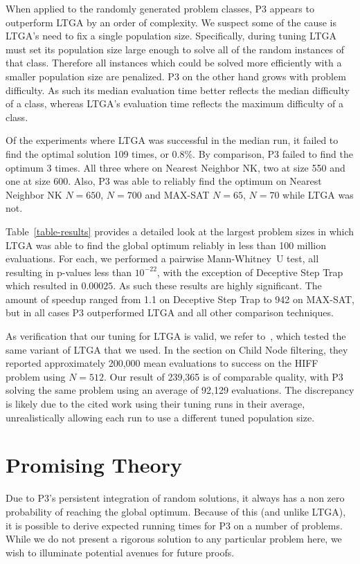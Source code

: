 \documentclass{sig-alternate}
\begin{document}
When applied to the randomly generated problem classes, P3 appears to outperform LTGA
by an order of complexity.  We suspect some of the cause is LTGA's need to fix
a single population size.  Specifically, during tuning LTGA must set its population
size large enough to solve all of the random instances of that class.  Therefore
all instances which could be solved more efficiently with a smaller population size
are penalized.  P3 on the other hand grows with problem difficulty.  As such its
median evaluation time better reflects the median difficulty of a class, whereas LTGA's
evaluation time reflects the maximum difficulty of a class.

Of the experiments where LTGA was successful in the median run, it failed to find the optimal solution
109 times, or 0.8\%.  By comparison, P3 failed to find the optimum 3 times.  All three
where on Nearest Neighbor NK, two at size 550 and one at size 600.  Also, P3 was able
to reliably find the optimum on Nearest Neighbor NK $N=650$, $N=700$ and MAX-SAT $N=65$, $N=70$
while LTGA was not.

Table~\ref{table-results} provides a detailed look at the largest problem sizes
in which LTGA was able to find the global optimum reliably in less than 100 million
evaluations.  For each, we performed a pairwise Mann-Whitney~U test, all resulting
in p-values less than $10^{-22}$, with the exception of Deceptive Step Trap which
resulted in $0.00025$.  As such these results are highly significant.  The amount
of speedup ranged from 1.1 on Deceptive Step Trap to 942 on MAX-SAT, but in all
cases P3 outperformed LTGA and all other comparison techniques.

As verification that our tuning for LTGA is valid, we refer
to~\cite{thierens:2013:ltgahiff}, which tested the same variant of LTGA that we
used.  In the section on Child Node filtering, they reported approximately 200,000
mean evaluations to success on the HIFF problem using $N=512$.  Our result of
239,365 is of comparable quality, with P3 solving the same problem using an average
of 92,129 evaluations.  The discrepancy is likely due to the cited work using
their tuning runs in their average, unrealistically allowing each run to use a different tuned population size.

\section{Promising Theory}
Due to P3's persistent integration of random solutions, it always has
a non zero probability of reaching the global optimum.  Because of
this (and unlike LTGA), it is possible to derive expected
running times for P3 on a number of problems.  While we do not present
a rigorous solution to any particular problem here, we wish to
illuminate potential avenues for future proofs.
\end{document}
